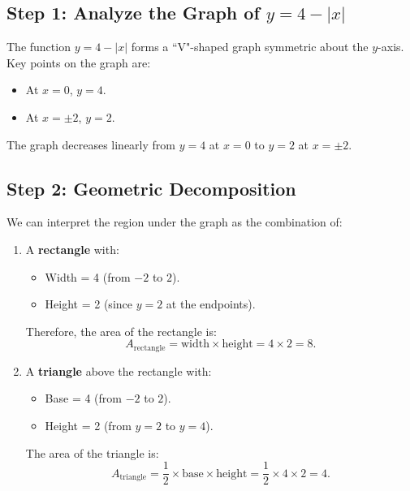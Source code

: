 \documentclass{article}
\begin{document}
\subsection*{Step 1: Analyze the Graph of \(y = 4 - |x|\)}
The function \(y = 4 - |x|\) forms a ``V"-shaped graph symmetric about the \(y\)-axis. Key points on the graph are:
\begin{itemize}
    \item At \(x = 0\), \(y = 4\).
    \item At \(x = \pm 2\), \(y = 2\).
\end{itemize}
The graph decreases linearly from \(y = 4\) at \(x = 0\) to \(y = 2\) at \(x = \pm 2\).



\subsection*{Step 2: Geometric Decomposition}
We can interpret the region under the graph as the combination of:
\begin{enumerate}
    \item A \textbf{rectangle} with:
    \begin{itemize}
        \item Width = 4 (from \(-2\) to \(2\)).
        \item Height = 2 (since \(y = 2\) at the endpoints).
    \end{itemize}
    Therefore, the area of the rectangle is:
    \[
    A_{\text{rectangle}} = \text{width} \times \text{height} = 4 \times 2 = 8.
    \]

    \item A \textbf{triangle} above the rectangle with:
    \begin{itemize}
        \item Base = 4 (from \(-2\) to \(2\)).
        \item Height = 2 (from \(y = 2\) to \(y = 4\)).
    \end{itemize}
    The area of the triangle is:
    \[
    A_{\text{triangle}} = \frac{1}{2} \times \text{base} \times \text{height}
    = \frac{1}{2} \times 4 \times 2 = 4.
    \]
\end{enumerate}
\end{document}
